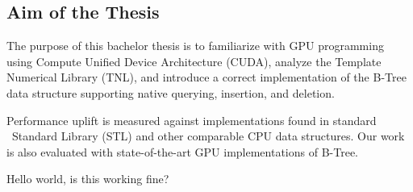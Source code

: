 \subsection{Aim of the Thesis}

The purpose of this bachelor thesis is to familiarize with GPU programming using Compute Unified Device Architecture (CUDA), analyze the Template Numerical Library (TNL), and introduce a correct implementation of the B-Tree data structure supporting native querying, insertion, and deletion.

Performance uplift is measured against implementations found in standard \CC\ Standard Library (STL) and other comparable CPU data structures. Our work is also evaluated with state-of-the-art GPU implementations of B-Tree.

Hello world, is this working fine?